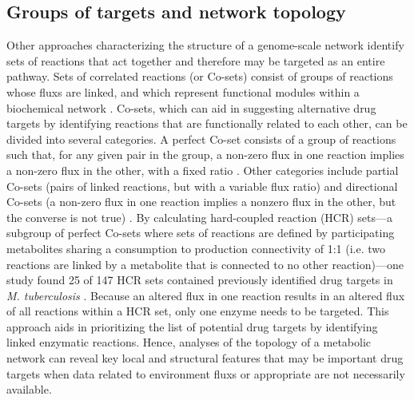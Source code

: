 \subsection{Groups of targets and network topology}
Other approaches characterizing the structure of a genome-scale 
network  identify sets of reactions that act 
together and therefore may be targeted as an entire pathway. 
Sets of correlated reactions (or Co-sets) consist of groups 
of reactions whose \glspl{flux} are linked, and which represent 
functional modules within a biochemical network \cite{Papin:2004eh}. Co-sets, 
which can aid in suggesting alternative drug targets by 
identifying reactions that are functionally related to each 
other, can be divided into several categories. A perfect 
Co-set consists of a group of reactions such that, for any 
given pair in the group, a non-zero \gls{flux} in one reaction 
implies a non-zero \gls{flux} in the other, with a fixed ratio . 
Other categories include partial Co-sets (pairs of linked 
reactions, but with a variable \gls{flux} ratio) and directional 
Co-sets (a non-zero \gls{flux} in one reaction implies a nonzero 
\gls{flux} in the other, but the converse is not true) \cite{Xi:2011gc}. By 
calculating hard-coupled reaction (HCR) sets---a subgroup 
of perfect Co-sets where sets of reactions are defined by 
participating metabolites sharing a consumption to production 
connectivity of 1:1 (i.e. two reactions are linked by a 
metabolite that is connected to no other reaction)---one study 
found 25 of 147 HCR sets contained previously identified drug targets 
in \textit{M. tuberculosis} \cite{Jamshidi:2007ei}. Because an altered \gls{flux} in one reaction 
results in an altered \gls{flux} of all reactions within a HCR set, only 
one enzyme needs to be targeted. This approach aids in prioritizing 
the list of potential drug targets by identifying linked enzymatic 
reactions. Hence, analyses of the topology of a metabolic network 
can reveal key local and structural features that may be important 
drug targets when data related to environment \glspl{flux} or appropriate 
 are not necessarily available.

